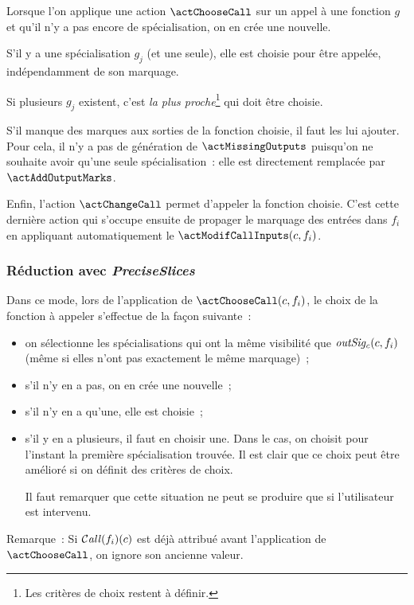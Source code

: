 Lorsque l'on applique une action $\actChooseCall$ 
sur un appel à une fonction $g$
et qu'il n'y a pas encore de spécialisation, on en crée une nouvelle.

S'il y a une spécialisation $g_j$ (et une seule), 
elle est choisie  pour être appelée, indépendamment de son marquage. 
\bb

Si plusieurs $g_j$ existent, c'est 
{\it la plus proche}\footnote{Les critères de choix restent à définir.}
qui doit être choisie.
\bb

S'il manque des marques aux sorties de la fonction choisie,
il faut les lui ajouter. Pour cela,
il n'y a pas de génération de $\actMissingOutputs$ puisqu'on ne souhaite avoir
qu'une seule spécialisation~: elle est directement remplacée 
par $\actAddOutputMarks$.
\bb

Enfin, l'action $\actChangeCall$ permet d'appeler la fonction choisie.
C'est cette dernière action qui s'occupe
ensuite de propager le marquage des entrées dans $f_i$
en appliquant automatiquement le $\actModifCallInputs(c, f_i)$.

\subsubsection{Réduction avec {\it PreciseSlices}}\label{sec-PreciseSlices}

Dans ce mode, lors de l'application de $\actChooseCall(c, f_i)$,
le choix de la fonction à appeler s'effectue de la façon suivante~:
\begin{itemize}
  \item on sélectionne les spécialisations qui ont la même visibilité
    que $\mathit{outSig_c}(c, f_i)$ (même si elles n'ont pas exactement le même
    marquage)~;
  \item s'il n'y en a pas, on en crée une nouvelle~;
  \item s'il n'y en a qu'une, elle est choisie~;
  \item s'il y en a plusieurs, il faut en choisir une.
Dans le cas, on choisit pour l'instant la première 
spécialisation trouvée. Il est clair que ce choix peut être amélioré
si on définit des critères de choix.

    Il faut remarquer que cette situation ne peut se produire que si
    l'utilisateur est intervenu.
\end{itemize}


Remarque~: Si $\operatorname{\mathcal{C\mathit{all}}}(f_i)(c)$ est déjà attribué avant l'application de 
$\actChooseCall$, on ignore son ancienne valeur.\\

